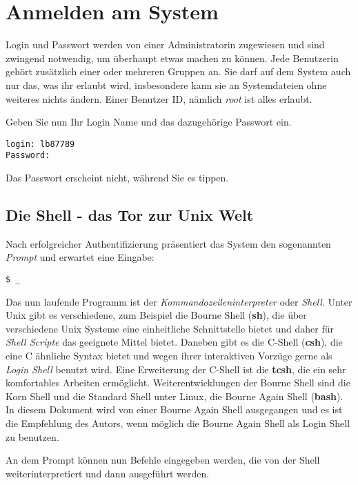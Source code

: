\documentclass[titlepage,a4paper]{article}
\begin{document}
\section{Anmelden am System}

Login und Passwort werden von einer Administratorin zugewiesen und sind
zwingend notwendig, um überhaupt etwas machen zu können.  Jede Benutzerin
gehört zusätzlich einer oder mehreren Gruppen an.  Sie darf auf dem System
auch nur das, was ihr erlaubt wird, insbesondere kann sie an Systemdateien
ohne weiteres nichts ändern.  Einer Benutzer ID, nämlich \emph{root} ist alles
erlaubt.

Geben Sie nun Ihr Login Name und das dazugehörige Passwort ein.

\begin{verbatim}
login: lb87789
Password:
\end{verbatim}

Das Passwort erscheint nicht, während Sie es tippen.

\subsection{Die Shell - das Tor zur Unix Welt}
\label{sec:shell}

Nach erfolgreicher Authentifizierung präsentiert das System den sogenannten
\emph{Prompt} und erwartet eine Eingabe:

\begin{verbatim}
$ _
\end{verbatim}

Das nun laufende Programm ist der \emph{Kommandozeileninterpreter} oder
\emph{Shell}. 
Unter Unix gibt es
verschiedene, zum Beispiel die Bourne Shell (\textbf{sh}), die über
verschiedene Unix Systeme eine einheitliche Schnittstelle bietet und daher für
\emph{Shell Scripte} das geeignete Mittel bietet.
Daneben gibt es die C-Shell (\textbf{csh}), die eine C ähnliche Syntax bietet
und wegen ihrer 
interaktiven Vorzüge gerne als \emph{Login Shell} benutzt wird.  Eine
Erweiterung der C-Shell ist die \textbf{tcsh}, die ein sehr komfortables
Arbeiten ermöglicht.  Weiterentwicklungen der Bourne Shell sind die Korn Shell
und die Standard Shell unter Linux, die Bourne Again Shell (\textbf{bash}).
In diesem Dokument wird von einer Bourne Again Shell ausgegangen und es ist
die Empfehlung des Autors, wenn möglich die Bourne Again Shell als Login Shell
zu benutzen.

An dem Prompt können nun Befehle eingegeben werden, die von der Shell
weiterinterpretiert und dann ausgeführt werden.
\end{document}
